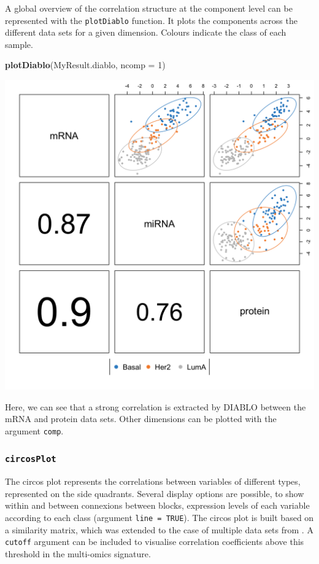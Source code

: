 \documentclass[]{book}
\newenvironment{Shaded}{\begin{snugshade}}{\end{snugshade}}
\newcommand{\DataTypeTok}[1]{\textcolor[rgb]{0.13,0.29,0.53}{#1}}
\newcommand{\DecValTok}[1]{\textcolor[rgb]{0.00,0.00,0.81}{#1}}
\newcommand{\KeywordTok}[1]{\textcolor[rgb]{0.13,0.29,0.53}{\textbf{#1}}}
\newcommand{\NormalTok}[1]{#1}
\begin{document}
A global overview of the correlation structure at the component level can be represented with the \texttt{plotDiablo} function. It plots the components across the different data sets for a given dimension. Colours indicate the class of each sample.

\begin{Shaded}
\begin{Highlighting}[]
\KeywordTok{plotDiablo}\NormalTok{(MyResult.diablo, }\DataTypeTok{ncomp =} \DecValTok{1}\NormalTok{)}
\end{Highlighting}
\end{Shaded}

\begin{center}\includegraphics[width=0.75\linewidth,]{Figures/06-diablo-plotDiablo-1} \end{center}

Here, we can see that a strong correlation is extracted by DIABLO between the mRNA and protein data sets. Other dimensions can be plotted with the argument \texttt{comp}.

\hypertarget{circosplot}{%
\subsubsection{\texorpdfstring{\texttt{circosPlot}}{circosPlot}}\label{circosplot}}

The circos plot represents the correlations between variables of different types, represented on the side quadrants. Several display options are possible, to show within and between connexions between blocks, expression levels of each variable according to each class (argument \texttt{line\ =\ TRUE}). The circos plot is built based on a similarity matrix, which was extended to the case of multiple data sets from \citep{Gon12}. A \texttt{cutoff} argument can be included to visualise correlation coefficients above this threshold in the multi-omics signature.
\end{document}
